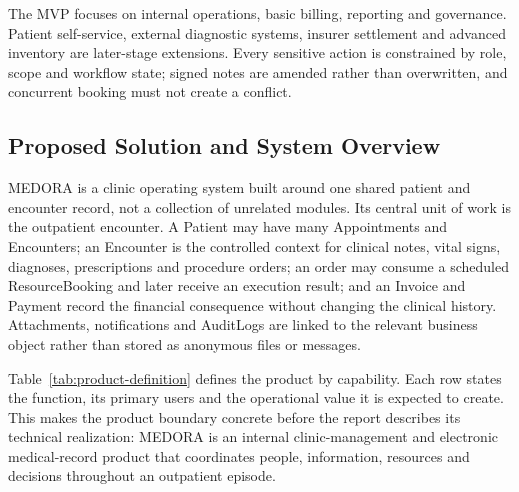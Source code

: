 \documentclass[a4paper,12pt]{article}
\begin{document}
The MVP focuses on internal operations, basic billing, reporting and governance. Patient self-service, external diagnostic systems, insurer settlement and advanced inventory are later-stage extensions. Every sensitive action is constrained by role, scope and workflow state; signed notes are amended rather than overwritten, and concurrent booking must not create a conflict.

\subsection{Proposed Solution and System Overview}
MEDORA is a clinic operating system built around one shared patient and encounter record, not a collection of unrelated modules. Its central unit of work is the outpatient encounter. A Patient may have many Appointments and Encounters; an Encounter is the controlled context for clinical notes, vital signs, diagnoses, prescriptions and procedure orders; an order may consume a scheduled ResourceBooking and later receive an execution result; and an Invoice and Payment record the financial consequence without changing the clinical history. Attachments, notifications and AuditLogs are linked to the relevant business object rather than stored as anonymous files or messages.

Table~\ref{tab:product-definition} defines the product by capability. Each row states the function, its primary users and the operational value it is expected to create. This makes the product boundary concrete before the report describes its technical realization: MEDORA is an internal clinic-management and electronic medical-record product that coordinates people, information, resources and decisions throughout an outpatient episode.
\end{document}
